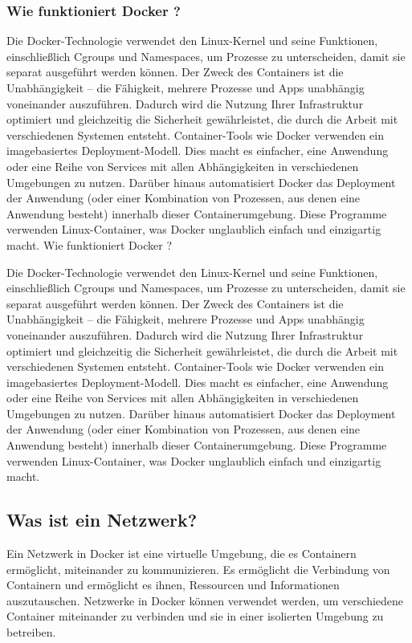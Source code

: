 \subsubsection{Wie funktioniert Docker ?}


Die Docker-Technologie verwendet den Linux-Kernel und seine Funktionen, einschließlich Cgroups und Namespaces, um Prozesse zu unterscheiden, damit sie separat ausgeführt werden können. Der Zweck des Containers ist die Unabhängigkeit – die Fähigkeit, mehrere Prozesse und Apps unabhängig voneinander auszuführen. Dadurch wird die Nutzung Ihrer Infrastruktur optimiert und gleichzeitig die Sicherheit gewährleistet, die durch die Arbeit mit verschiedenen Systemen entsteht. 
Container-Tools wie Docker verwenden ein imagebasiertes Deployment-Modell. Dies macht es einfacher, eine Anwendung oder eine Reihe von Services mit allen Abhängigkeiten in verschiedenen Umgebungen zu nutzen. Darüber hinaus automatisiert Docker das Deployment der Anwendung (oder einer Kombination von Prozessen, aus denen eine Anwendung besteht) innerhalb dieser Containerumgebung.
Diese Programme verwenden Linux-Container, was Docker unglaublich einfach und einzigartig macht.
Wie funktioniert Docker ?


Die Docker-Technologie verwendet den Linux-Kernel und seine Funktionen, einschließlich Cgroups und Namespaces, um Prozesse zu unterscheiden, damit sie separat ausgeführt werden können. Der Zweck des Containers ist die Unabhängigkeit – die Fähigkeit, mehrere Prozesse und Apps unabhängig voneinander auszuführen. Dadurch wird die Nutzung Ihrer Infrastruktur optimiert und gleichzeitig die Sicherheit gewährleistet, die durch die Arbeit mit verschiedenen Systemen entsteht. 
Container-Tools wie Docker verwenden ein imagebasiertes Deployment-Modell. Dies macht es einfacher, eine Anwendung oder eine Reihe von Services mit allen Abhängigkeiten in verschiedenen Umgebungen zu nutzen. Darüber hinaus automatisiert Docker das Deployment der Anwendung (oder einer Kombination von Prozessen, aus denen eine Anwendung besteht) innerhalb dieser Containerumgebung.
Diese Programme verwenden Linux-Container, was Docker unglaublich einfach und einzigartig macht.


\subsection{Was ist ein Netzwerk?}

Ein Netzwerk in Docker ist eine virtuelle Umgebung, die es Containern ermöglicht, miteinander zu kommunizieren. Es ermöglicht die Verbindung von Containern und ermöglicht es ihnen, Ressourcen und Informationen auszutauschen. Netzwerke in Docker können verwendet werden, um verschiedene Container miteinander zu verbinden und sie in einer isolierten Umgebung zu betreiben. 

